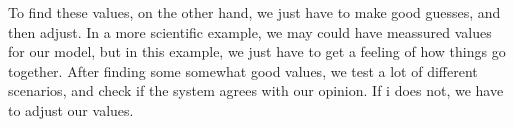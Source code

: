 To find these values, on the other hand, we just have to make good guesses, and
then adjust. In a more scientific example, we may could have meassured values
for our model, but in this example, we just have to get a feeling of how things
go together. After finding some somewhat good values, we test a lot of different
scenarios, and check if the system agrees with our opinion. If i does not, we
have to adjust our values.

